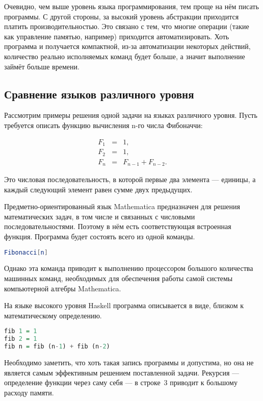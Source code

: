 Очевидно, чем выше уровень языка программирования, тем проще на нём
писать программы. С другой стороны, за высокий уровень абстракции
приходится платить производительностью. Это связано с тем, что многие
операции (такие как управление памятью, например) приходится
автоматизировать. Хоть программа и получается компактной, из-за
автоматизации некоторых действий, количество реально исполняемых
команд будет больше, а значит выполнение займёт больше времени.

\subsection{Сравнение языков различного уровня}

Рассмотрим примеры решения одной задачи на языках различного уровня.
Пусть требуется описать функцию вычисления n-го числа Фибоначчи:

\begin{eqnarray*}
F_{1} & = & 1,\\
F_{2} & = & 1,\\
F_{n} & = & F_{n-1}+F_{n-2}.
\end{eqnarray*}

Это числовая последовательность, в которой первые два элемента —
единицы, а каждый следующий элемент равен сумме двух предыдущих.

Предметно-ориентированный язык Mathematica предназначен для решения
математических задач, в том числе и связанных с числовыми
последовательностями. Поэтому в нём есть соответствующая встроенная
функция. Программа будет состоять всего из одной команды.

\begin{lstlisting}[language=Mathematica]
Fibonacci[n]
\end{lstlisting}

Однако эта команда приводит к выполнению процессором большого
количества машинных команд, необходимых для обеспечения работы самой
системы компьютерной алгебры Mathematica.

На языке высокого уровня Haskell программа описывается в виде, близком
к математическому определению.

\begin{lstlisting}[language=Haskell]
fib 1 = 1
fib 2 = 1
fib n = fib (n-1) + fib (n-2)
\end{lstlisting}

Необходимо заметить, что хоть такая запись программы и допустима, но
она не является самым эффективным решением поставленной задачи.
Рекурсия — определение функции через саму себя — в строке~3 приводит к
большому расходу памяти.

